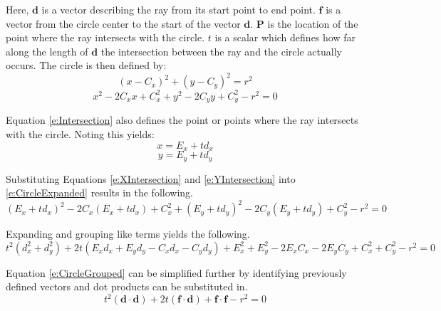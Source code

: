 \documentclass[12pt,onecolumn]{report}
\begin{document}
Here, $\boldsymbol{d}$ is a vector describing the ray from its start point to end point. $\boldsymbol{f}$ is a vector from the circle center to the start of the vector $\boldsymbol{d}$. $\boldsymbol{P}$ is the location of the point where the ray intersects with the circle. $t$ is a scalar which defines how far along the length of $\boldsymbol{d}$ the intersection between the ray and the circle actually occurs. The circle is then defined by:
%
\begin{equation}\label{e:Circle}
\left(x - C_{x}\right)^{2} +   \left(y - C_{y}\right)^{2} = r^2
\end{equation}
\begin{equation}\label{e:CircleExpanded}
x^2 - 2C_{x}x + C_{x}^{2} + y^2 - 2C_{y}y+ C_{y}^{2} - r^2 = 0
\end{equation}

Equation \eqref{e:Intersection} also defines the point or points where the ray intersects with the circle. Noting this yields:
%
\begin{equation}\label{e:XIntersection}
x = E_{x} + td_{x} 
\end{equation}
\begin{equation}\label{e:YIntersection}
y = E_{y} + td_{y} 
\end{equation}

Substituting Equations \eqref{e:XIntersection} and \eqref{e:YIntersection} into \eqref{e:CircleExpanded} results in the following.
%
\begin{equation}\label{e:CircleSubst}
\left(E_{x} + td_{x}\right)^2 - 2C_{x}\left(E_{x} + td_{x}\right) + C_{x}^{2} + \left(E_{y} + td_{y}\right)^2 - 2C_{y}\left(E_{y} + td_{y}\right)+ C_{y}^{2} - r^2 = 0
\end{equation}

Expanding and grouping like terms yields the following.
%
\begin{equation}\label{e:CircleGrouped}
t^{2}\left(d_{x}^{2} + d_{y}^{2}\right) + 2t\left(E_{x}d_{x} + E_{y}d_{y} - C_{x}d_{x} - C_{y}d_{y}\right) + E_{x}^{2} + E_{y}^{2} - 2 E_{x}C_{x} - 2 E_{y}C_{y} + C_{x}^{2} + C_{y}^{2} - r^{2} = 0
\end{equation}

Equation \eqref{e:CircleGrouped} can be simplified further by identifying previously defined vectors and dot products can be substituted in.
%
\begin{equation}\label{e:RayCircleIntersection}
t^{2}\left(\boldsymbol{d}\cdot\boldsymbol{d}\right) + 2t\left(\boldsymbol{f}\cdot\boldsymbol{d}\right) +\boldsymbol{f}\cdot\boldsymbol{f} - r^{2} = 0
\end{equation}
\end{document}
